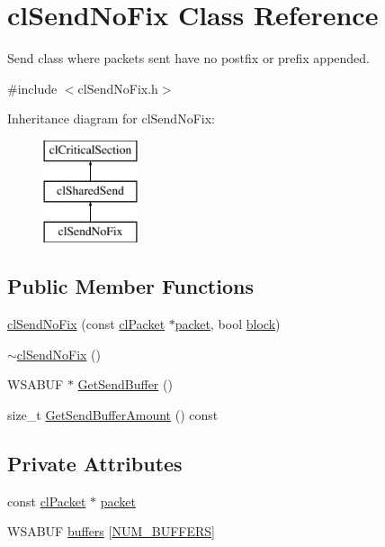 \hypertarget{classcl_send_no_fix}{
\section{clSendNoFix Class Reference}
\label{classcl_send_no_fix}
}


Send class where packets sent have no postfix or prefix appended.  




{\ttfamily \#include $<$clSendNoFix.h$>$}

Inheritance diagram for clSendNoFix:\begin{figure}[H]
\begin{center}
\leavevmode
\includegraphics[height=3.000000cm]{classcl_send_no_fix}
\end{center}
\end{figure}
\subsection*{Public Member Functions}
\begin{DoxyCompactItemize}
\item 
\hyperlink{classcl_send_no_fix_ab5b03174a12c8320080d2d6c59fe6d12}{clSendNoFix} (const \hyperlink{classcl_packet}{clPacket} $\ast$\hyperlink{classcl_send_no_fix_a4e895114dfe8af11712e74afbc51b2c4}{packet}, bool \hyperlink{classcl_shared_send_aaaf411d2405cc3447a3bc11fe2ab2678}{block})
\item 
\hyperlink{classcl_send_no_fix_a9ca7a72e078a2010519a6a84bd9e9665}{$\sim$clSendNoFix} ()
\item 
WSABUF $\ast$ \hyperlink{classcl_send_no_fix_a5a54f2f0b035e4efdcd92fb303317c91}{GetSendBuffer} ()
\item 
size\_\-t \hyperlink{classcl_send_no_fix_adfbc420bd3ff9bd6fa61bf1eebdcffd4}{GetSendBufferAmount} () const 
\end{DoxyCompactItemize}
\subsection*{Private Attributes}
\begin{DoxyCompactItemize}
\item 
const \hyperlink{classcl_packet}{clPacket} $\ast$ \hyperlink{classcl_send_no_fix_a4e895114dfe8af11712e74afbc51b2c4}{packet}
\item 
WSABUF \hyperlink{classcl_send_no_fix_a110a8eb3acce114667b80a03e9171139}{buffers} \mbox{[}\hyperlink{classcl_send_no_fix_a587bdc2cbd43afeca12c1f94501cc80a}{NUM\_\-BUFFERS}\mbox{]}
\end{DoxyCompactItemize}
